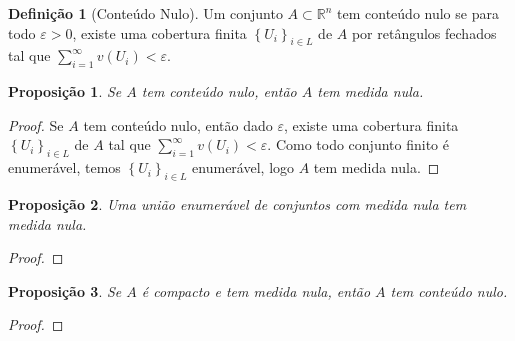 \documentclass{article}
\theoremstyle{plain}
\newtheorem{prop}{Proposição}[section]
\theoremstyle{definition}
\newtheorem{definicao}{Definição}[section]
\theoremstyle{remark}
\begin{document}
\begin{definicao}[Conteúdo Nulo]
	Um conjunto $A\subset \mathbb{R}^n$ tem conteúdo nulo se para todo $\varepsilon>0$,  existe uma cobertura finita    $\left\{ U_i \right\}_{i\in L}$ de  $A$ por retângulos fechados tal que $\displaystyle\sum_{i = 1}^{\infty} v\left(U_i\right) < \varepsilon$.
\end{definicao}
\begin{prop}
	Se $A$ tem conteúdo nulo, então $A$ tem medida nula.
\end{prop}
\begin{proof}
	Se $A$ tem conteúdo nulo, então dado $\varepsilon$,  existe uma cobertura finita $\left\{ U_i \right\}_{i \in L}$ de $A$ tal que $\displaystyle\sum_{i = 1}^{\infty} v\left(U_i\right) < \varepsilon$. Como todo conjunto finito é enumerável, temos $\left\{ U_i \right\}_{i\in L}$ enumerável, logo $A$ tem medida nula.
\end{proof}
\begin{prop}
	Uma união enumerável de conjuntos com medida nula tem medida nula.
\end{prop}
\begin{proof}
\end{proof}
\begin{prop}
	Se $A$ é compacto e tem medida nula, então $A$ tem conteúdo nulo.
\end{prop}
\begin{proof}
\end{proof}
\end{document}
